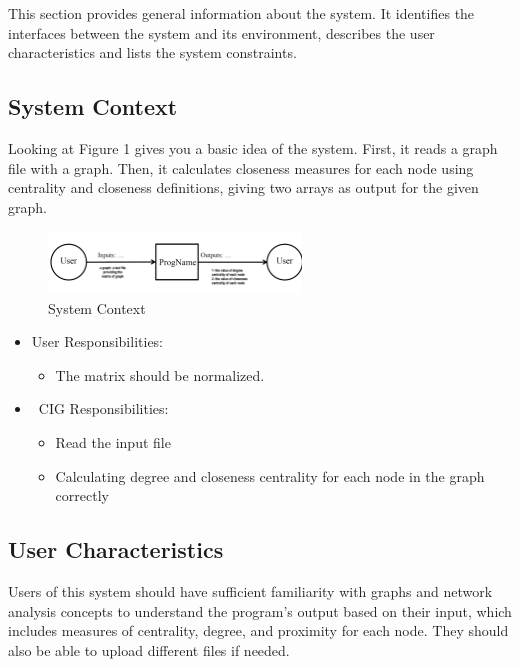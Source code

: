 \documentclass[12pt]{article}
\begin{document}
This section provides general information about the system.  It identifies the
interfaces between the system and its environment, describes the user
characteristics and lists the system constraints. 

\subsection{System Context}


Looking at Figure 1 gives you a basic idea of the system. First, it reads a graph file with a graph. Then, it calculates closeness measures for each node using centrality and closeness definitions, giving two arrays as output for the given graph.

\begin{figure}[h!]
\begin{center}
 \includegraphics[width=0.6\textwidth]{srspicture}
\caption{System Context}
\label{Fig_SystemContext} 
\end{center}
\end{figure}


\begin{itemize}
\item User Responsibilities: 
\begin{itemize}
\item The matrix should be normalized.
\end{itemize}
\item \ CIG Responsibilities:
\begin{itemize}
\item Read the input file
\item Calculating degree and closeness centrality for each node in the graph correctly
\end{itemize}
\end{itemize}




\subsection{User Characteristics} \label{SecUserCharacteristics}
Users of this system should have sufficient familiarity with graphs and network analysis concepts to understand the program's output based on their input, which includes measures of centrality, degree, and proximity for each node. They should also be able to upload different files if needed.
\end{document}

